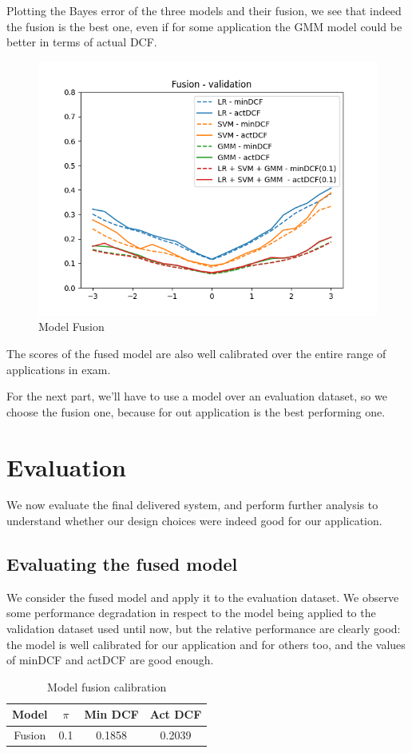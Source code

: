 \documentclass[12pt, a4paper]{article}
\begin{document}
Plotting the Bayes error of the three models and their fusion, we see that indeed the fusion is the best one, even if for some application the GMM model could be better in terms of actual DCF.

\begin{figure}[ht]
	\centering
	\includegraphics[width=.4\textwidth]{project11/validation}
	\caption{Model Fusion}
	\label{fig:Model_Fusion}
\end{figure}

The scores of the fused model are also well calibrated over the entire range of applications in exam.

For the next part, we'll have to use a model over an evaluation dataset, so we choose the fusion one, because for out application is the best performing one.

\clearpage

\section{Evaluation}
We now evaluate the final delivered system, and perform further analysis to understand whether our design choices were indeed good for our application.

\subsection{Evaluating the fused model}
We consider the fused model and apply it to the evaluation dataset. We observe some performance degradation in respect to the model being applied to the validation dataset used until now, but the relative performance are clearly good: the model is well calibrated for our application and for others too, and the values of minDCF and actDCF are good enough.

\begin{table}[ht!]
	\centering
 	\begin{tabular}{| | c c c c | |} 
 		\hline
 		Model & $\pi$ & Min DCF & Act DCF\\
 		\hline\hline
 		Fusion & 0.1 &  0.1858 & 0.2039\\
 		\hline
 	\end{tabular}
	\caption{Model fusion calibration}
\end{table}
\end{document}
